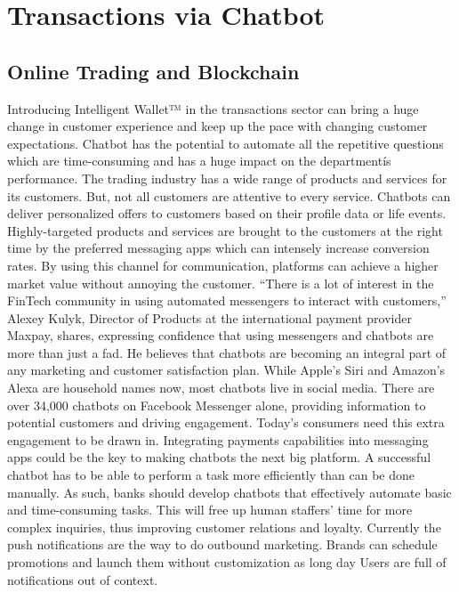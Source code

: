 \documentclass[	DIV=calc,%
							paper=letter,%
							fontsize=12pt%
                            ]{scrartcl}	 					%
\begin{document}
\section{\label{sec:level1}Transactions via Chatbot}

\subsection{\label{sec:level1}Online Trading and Blockchain}

Introducing Intelligent Wallet™ in the transactions sector can bring a huge change in customer experience and keep up the pace with changing customer expectations. Chatbot has the potential to automate all the repetitive questions which are time-consuming and has a huge impact on the departmentís performance. 
The trading industry has a wide range of products and services for its customers. But, not all customers are attentive to every service. Chatbots can deliver personalized offers to customers based on their profile data or life events. Highly-targeted products and services are brought to the customers at the right time by the preferred messaging apps which can intensely increase conversion rates. By using this channel for communication, platforms can achieve a higher market value without annoying the customer.
“There is a lot of interest in the FinTech community in using automated messengers to interact with customers,” Alexey Kulyk, Director of Products at the international payment provider Maxpay, shares, expressing confidence that using messengers and chatbots are more than just a fad. He believes that chatbots are becoming an integral part of any marketing and customer satisfaction plan.
While Apple’s Siri and Amazon’s Alexa are household names now, most chatbots live in social media. There are over 34,000 chatbots on Facebook Messenger alone, providing information to potential customers and driving engagement. Today’s consumers need this extra engagement to be drawn in. Integrating payments capabilities into messaging apps could be the key to making chatbots the next big platform.
A successful chatbot has to be able to perform a task more efficiently than can be done manually. As such, banks should develop chatbots that effectively automate basic and time-consuming tasks. This will free up human staffers' time for more complex inquiries, thus improving customer relations and loyalty.
Currently the push notifications are the way to do outbound marketing.
Brands can schedule promotions and launch them without customization as long day Users are full of notifications out of context.
\end{document}
